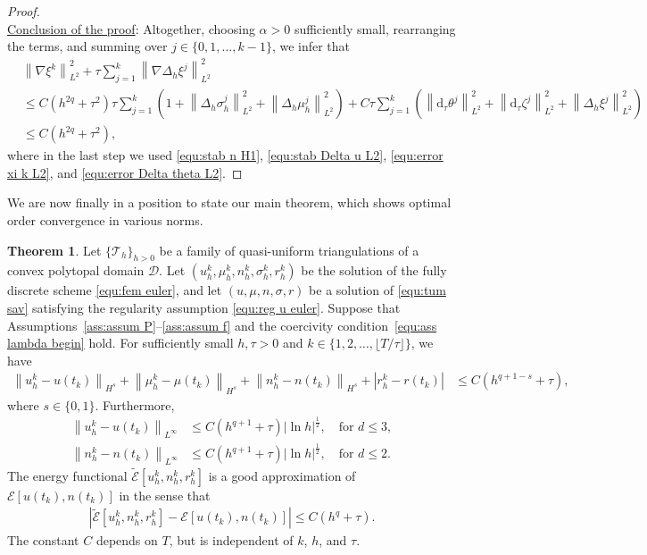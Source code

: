\documentclass[11pt, reqno]{amsart}
\theoremstyle{definition}
\newtheorem{theorem}{Theorem}[section]
\numberwithin{equation}{section}
\newcommand{\dtt}{\mathrm{d}_\tau}
\newcommand{\norm}[2]{\left\|{#1}\right\|_{#2}}
\newcommand{\abs}[1]{\left|{#1}\right|}
\begin{document}
\begin{proof}
\\
\underline{Conclusion of the proof}: Altogether, choosing $\alpha>0$ sufficiently small, rearranging the terms, and summing over $j\in \{0,1,\ldots,k-1\}$, we infer that
\begin{align*}
    &\norm{\nabla \xi^k}{L^2}^2 
    +
    \tau \sum_{j=1}^k \norm{\nabla\Delta_h \xi^j}{L^2}^2
    \\
    &\leq
    C(h^{2q}+\tau^2) \tau\sum_{j=1}^k \left(1+\norm{\Delta_h \sigma_h^j}{L^2}^2 + \norm{\Delta_h \mu_h^j}{L^2}^2 \right) 
    +
    C\tau \sum_{j=1}^k \left(\norm{\dtt \theta^j}{L^2}^2 + \norm{\dtt \zeta^j}{L^2}^2 + \norm{\Delta_h \xi^j}{L^2}^2 \right)
    \\
    &\leq
    C(h^{2q}+\tau^2),
\end{align*}
where in the last step we used \eqref{equ:stab n H1}, \eqref{equ:stab Delta u L2}, \eqref{equ:error xi k L2}, and \eqref{equ:error Delta theta L2}.
\end{proof}

We are now finally in a position to state our main theorem, which shows optimal order convergence in various norms.

\begin{theorem}\label{the:main}
Let $\{\mathcal{T}_h\}_{h>0}$ be a family of quasi-uniform triangulations of a convex polytopal domain $\mathscr{D}$.
Let $(u_h^k,\mu_h^k,n_h^k,\sigma_h^k,r_h^k)$ be the solution of the fully discrete scheme \eqref{equ:fem euler}, and let $(u,\mu,n,\sigma,r)$ be a solution of \eqref{equ:tum sav} {satisfying the regularity assumption \eqref{equ:reg u euler}}. Suppose that Assumptions~\ref{ass:assum P}--\ref{ass:assum f} and the coercivity condition~\eqref{equ:ass lambda begin} hold. For sufficiently small $h,\tau >0$ and $k\in \{1,2,\ldots,\lfloor T/\tau \rfloor\}$, we have
\begin{align}
\label{equ:error euler Hs}
    \norm{u_h^k-u(t_k)}{H^s}
    +
    \norm{\mu_h^k-\mu(t_k)}{H^s}
    +
    \norm{n_h^k-n(t_k)}{H^s}
    +
    \abs{r_h^k-r(t_k)}
    &\leq
    C(h^{q+1-s}+\tau),
\end{align}
where $s\in \{0,1\}$.
Furthermore,
\begin{equation}\label{equ:error euler Linfty}
\begin{aligned}
    \norm{u_h^k-u(t_k)}{L^\infty}
    &\leq
    C(h^{q+1}+\tau) \abs{\ln h}^{\frac12}, \quad \text{for $d\leq 3$},
    \\
    \norm{n_h^k-n(t_k)}{L^\infty}
    &\leq
    C(h^{q+1}+\tau) \abs{\ln h}^{\frac12}, \quad \text{for $d\leq 2$}.
\end{aligned}
\end{equation}
The energy functional $\widetilde{\mathcal{E}}[u_h^k,n_h^k,r_h^k]$ is a good approximation of $\mathcal{E}[u(t_k),n(t_k)]$ in the sense that
\begin{align}\label{equ:good app ener}
    \abs{\widetilde{\mathcal{E}}[u_h^k,n_h^k,r_h^k] - \mathcal{E}[u(t_k),n(t_k)]} \leq C(h^q+\tau).
\end{align}
The constant $C$ depends on $T$, but is independent of $k$, $h$, and $\tau$.
\end{theorem}
\end{document}
